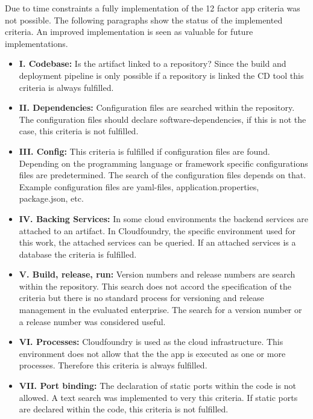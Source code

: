 Due to time constraints a fully implementation of the 12 factor app criteria was not possible. The following paragraphs show the status of the implemented criteria. An improved implementation is seen as valuable for future implementations.
\begin{itemize}
\item \textbf{I. Codebase:} Is the artifact linked to a repository? Since the build and deployment pipeline is only possible if a repository is linked the CD tool this criteria is always fulfilled. 

\item \textbf{II. Dependencies:} Configuration files are searched within the repository. The configuration files should declare software-dependencies, if this is not the case, this criteria is not fulfilled.

\item \textbf{III. Config:} This criteria is fulfilled if configuration files are found. Depending on the programming language or framework specific configurations files are predetermined. The search of the configuration files depends on that. Example configuration files are yaml-files, application.properties, package.json, etc.

\item \textbf{IV. Backing Services:} In some cloud environments the backend services are attached to an artifact. In Cloudfoundry, the specific environment used for this work, the attached services can be queried. If an attached services is a database the criteria is fulfilled. 

\item \textbf{V. Build, release, run:} Version numbers and release numbers are search within the repository. This search does not accord the specification of the criteria but there is no standard process for versioning and release management in the evaluated enterprise. The search for a version number or a release number was considered useful.

\item \textbf{VI. Processes:} Cloudfoundry is used as the cloud infrastructure. This environment does not allow that the the app is executed as one or more processes. Therefore this criteria is always fulfilled. 

\item \textbf{VII. Port binding:} The declaration of static ports within the code is not allowed. A text search was implemented to very this criteria. If static ports are declared within the code, this criteria is not fulfilled.


\end{itemize}
